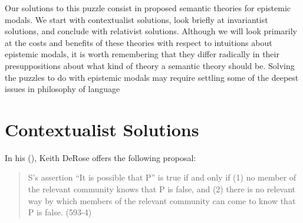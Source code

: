\documentclass[
  10pt,
  letterpaper,
  DIV=11,
  numbers=noendperiod,
  twoside]{scrartcl}
\begin{document}
Our solutions to this puzzle consist in proposed semantic theories for
epistemic modals. We start with contextualist solutions, look briefly at
invariantist solutions, and conclude with relativist solutions. Although
we will look primarily at the costs and benefits of these theories with
respect to intuitions about epistemic modals, it is worth remembering
that they differ radically in their presuppositions about what kind of
theory a semantic theory should be. Solving the puzzles to do with
epistemic modals may require settling some of the deepest issues in
philosophy of language

\section{Contextualist Solutions}\label{contextualist-solutions}

In his (), Keith DeRose offers the
following proposal:

\begin{quote}
S's assertion ``It is possible that P'' is true if and only if (1) no
member of the relevant community knows that P is false, and (2) there is
no relevant way by which members of the relevant community can come to
know that P is false. (593-4)
\end{quote}
\end{document}

